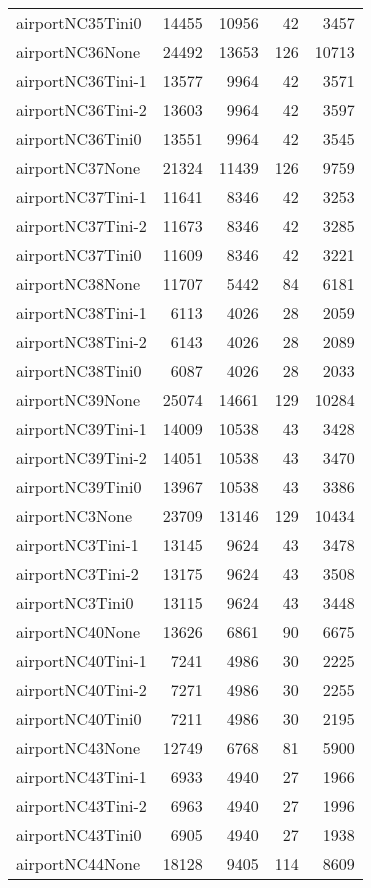 \begin{longtable}{lrrrr}
airportNC35Tini0 & 14455 & 10956 & 42 & 3457 \\
airportNC36None & 24492 & 13653 & 126 & 10713 \\
airportNC36Tini-1 & 13577 & 9964 & 42 & 3571 \\
airportNC36Tini-2 & 13603 & 9964 & 42 & 3597 \\
airportNC36Tini0 & 13551 & 9964 & 42 & 3545 \\
airportNC37None & 21324 & 11439 & 126 & 9759 \\
airportNC37Tini-1 & 11641 & 8346 & 42 & 3253 \\
airportNC37Tini-2 & 11673 & 8346 & 42 & 3285 \\
airportNC37Tini0 & 11609 & 8346 & 42 & 3221 \\
airportNC38None & 11707 & 5442 & 84 & 6181 \\
airportNC38Tini-1 & 6113 & 4026 & 28 & 2059 \\
airportNC38Tini-2 & 6143 & 4026 & 28 & 2089 \\
airportNC38Tini0 & 6087 & 4026 & 28 & 2033 \\
airportNC39None & 25074 & 14661 & 129 & 10284 \\
airportNC39Tini-1 & 14009 & 10538 & 43 & 3428 \\
airportNC39Tini-2 & 14051 & 10538 & 43 & 3470 \\
airportNC39Tini0 & 13967 & 10538 & 43 & 3386 \\
airportNC3None & 23709 & 13146 & 129 & 10434 \\
airportNC3Tini-1 & 13145 & 9624 & 43 & 3478 \\
airportNC3Tini-2 & 13175 & 9624 & 43 & 3508 \\
airportNC3Tini0 & 13115 & 9624 & 43 & 3448 \\
airportNC40None & 13626 & 6861 & 90 & 6675 \\
airportNC40Tini-1 & 7241 & 4986 & 30 & 2225 \\
airportNC40Tini-2 & 7271 & 4986 & 30 & 2255 \\
airportNC40Tini0 & 7211 & 4986 & 30 & 2195 \\
airportNC43None & 12749 & 6768 & 81 & 5900 \\
airportNC43Tini-1 & 6933 & 4940 & 27 & 1966 \\
airportNC43Tini-2 & 6963 & 4940 & 27 & 1996 \\
airportNC43Tini0 & 6905 & 4940 & 27 & 1938 \\
airportNC44None & 18128 & 9405 & 114 & 8609 \\

\end{longtable}
